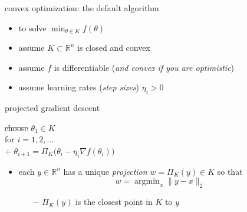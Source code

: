 \documentclass[xcolor={svgnames},
               hyperref={colorlinks,citecolor=DeepPink4,linkcolor=FireBrick,urlcolor=Maroon}]
               {beamer}
\newcommand{\grad}{\nabla}
\newcommand{\argmin}{\operatorname{argmin}}
\newcommand{\RR}{\mathbb{R}}
\newcommand{\ds}{\displaystyle}
\begin{document}
\begin{frame}{convex optimization: the default algorithm}

\begin{itemize}
\item to solve $\ds \min_{\theta \in K} f(\theta)$
\item assume $K\subset \RR^n$ is closed and convex
\item assume $f$ is differentiable (\emph{and convex if you are optimistic})
\item assume learning rates (\emph{step sizes}) $\eta_i>0$
\end{itemize}

\begin{block}{projected gradient descent}

\begin{pseudo*}
\st{choose} $\theta_1 \in K$ \\
for $i = 1,2,\dots$ \\+
    $\theta_{i+1} = \Pi_K \big(\theta_i - \eta_i \grad f(\theta_i)\big)$
\end{pseudo*}
\end{block}

\begin{itemize}
\item each $y\in \RR^n$ has a unique \emph{projection} $w = \Pi_K(y) \in K$ so that
    $$w = \argmin_x \|y - x\|_2$$

    \begin{itemize}
    \item[$-$] $\Pi_K(y)$ is the closest point in $K$ to $y$
    \end{itemize}
\end{itemize}
\end{frame}
\end{document}
